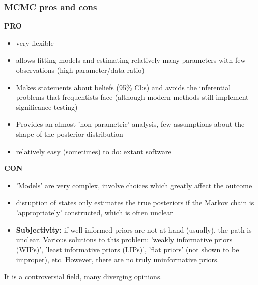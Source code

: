 \documentclass{article}
\begin{document}
\subsubsection{MCMC pros and cons}
\begin{minipage}{0.45\textwidth}
\textbf{PRO}
\begin{itemize}
    \item very flexible
    \item allows fitting models and estimating relatively many parameters with few observations (high parameter/data ratio)
    \item Makes statements about beliefs (95\% Cl:s) and avoids the inferential problems that frequentists face (although modern methods still implement significance testing)
    \item Provides an almost 'non-parametric' analysis, few assumptions about the shape of the posterior distribution
    \item relatively easy (sometimes) to do: extant software
\end{itemize}
\end{minipage}
\begin{minipage}{0.45\textwidth}
\textbf{CON}
\begin{itemize}
    \item 'Models' are very complex, involve choices which greatly affect the outcome
    \item disruption of states only estimates the true posteriors if the Markov chain is 'appropriately' constructed, which is often unclear
    \item \textbf{Subjectivity:} if well-informed priors are not at hand (usually), the path is unclear. Various solutions to this problem: 'weakly informative priors (WIPs)', 'least informative priors (LIPs)', 'flat priors' (not shown to be improper), etc. However, there are no truly uninformative priors.
\end{itemize}
\end{minipage} 
 \par 
\vspace{0.5cm}
It is a controversial field, many diverging opinions.
\end{document}

